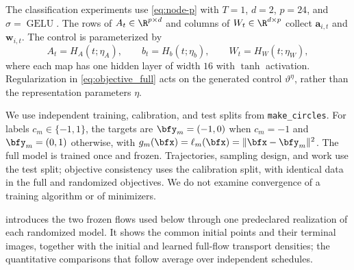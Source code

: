 The classification experiments use \eqref{eq:node-p} with $T=1$, $d=2$, $p=24$, and $\sigma=\operatorname{GELU}$. The rows of $A_t\in\R^{p\times d}$ and columns of $W_t\in\R^{d\times p}$ collect $\mathbf a_{i,t}$ and $\mathbf w_{i,t}$. The control is parameterized by
\[
A_t=H_A(t;\eta_A),\qquad b_t=H_b(t;\eta_b),\qquad W_t=H_W(t;\eta_W),
\]
where each map has one hidden layer of width $16$ with $\tanh$ activation. Regularization in \eqref{eq:objective_full} acts on the generated control $\vartheta^\eta$, rather than the representation parameters $\eta$.

We use independent training, calibration, and test splits from \texttt{make\_circles}. For labels $c_m\in\{-1,1\}$, the targets are $\bfy_m=(-1,0)$ when $c_m=-1$ and $\bfy_m=(0,1)$ otherwise, with $g_m(\bfx)=\ell_m(\bfx)=\|\bfx-\bfy_m\|^2$. The full model is trained once and frozen. Trajectories, sampling design, and work use the test split; objective consistency uses the calibration split, with identical data in the full and randomized objectives. We do not examine convergence of a training algorithm or of minimizers.

 introduces the two frozen flows used below through one predeclared realization of each randomized model. It shows the common initial points and their terminal images, together with the initial and learned full-flow transport densities; the quantitative comparisons that follow average over independent schedules.

